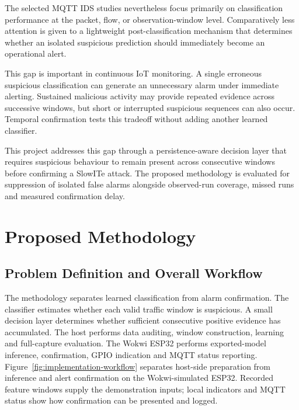 \documentclass[conference]{IEEEtran}
\begin{document}
The selected MQTT IDS studies nevertheless focus primarily on
classification performance at the packet, flow, or observation-window
level. Comparatively less attention is given to a lightweight
post-classification mechanism that determines whether an isolated
suspicious prediction should immediately become an operational alert.

This gap is important in continuous IoT monitoring. A single erroneous
suspicious classification can generate an unnecessary alarm under
immediate alerting. Sustained malicious activity may provide repeated evidence across
successive windows, but short or interrupted suspicious sequences can
also occur. Temporal confirmation tests this tradeoff without adding
another learned classifier.

This project addresses this gap through a persistence-aware decision layer
that requires suspicious behaviour to remain present across consecutive
windows before confirming a SlowITe attack. The proposed methodology is
evaluated for suppression of isolated false alarms alongside
observed-run coverage, missed runs and measured confirmation delay.

\section{Proposed Methodology}

\subsection{Problem Definition and Overall Workflow}

The methodology separates learned classification from alarm
confirmation. The classifier estimates whether each valid traffic
window is suspicious. A small decision layer determines whether
sufficient consecutive positive evidence has accumulated. The host
performs data auditing, window construction, learning and full-capture
evaluation. The Wokwi ESP32 performs exported-model inference,
confirmation, GPIO indication and MQTT status reporting.
Figure~\ref{fig:implementation-workflow} separates host-side preparation
from inference and alert confirmation on the Wokwi-simulated ESP32.
Recorded feature windows supply the demonstration inputs; local
indicators and MQTT status show how confirmation can be presented
and logged.
\end{document}
